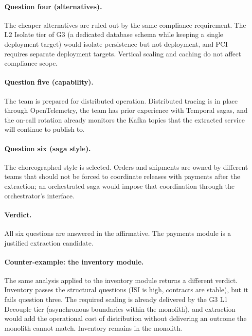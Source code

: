 \paragraph*{Question four (alternatives).} The cheaper alternatives are ruled out by the same compliance requirement. The L2 Isolate tier of G3 (a dedicated database schema while keeping a single deployment target) would isolate persistence but not deployment, and PCI requires separate deployment targets. Vertical scaling and caching do not affect compliance scope.

\paragraph*{Question five (capability).} The team is prepared for distributed operation. Distributed tracing is in place through OpenTelemetry, the team has prior experience with Temporal sagas, and the on-call rotation already monitors the Kafka topics that the extracted service will continue to publish to.

\paragraph*{Question six (saga style).} The choreographed style is selected. Orders and shipments are owned by different teams that should not be forced to coordinate releases with payments after the extraction; an orchestrated saga would impose that coordination through the orchestrator's interface.

\paragraph*{Verdict.} All six questions are answered in the affirmative. The payments module is a justified extraction candidate.

\paragraph*{Counter-example: the inventory module.} The same analysis applied to the inventory module returns a different verdict. Inventory passes the structural questions (ISI is high, contracts are stable), but it fails question three. The required scaling is already delivered by the G3 L1 Decouple tier (asynchronous boundaries within the monolith), and extraction would add the operational cost of distribution without delivering an outcome the monolith cannot match. Inventory remains in the monolith.

